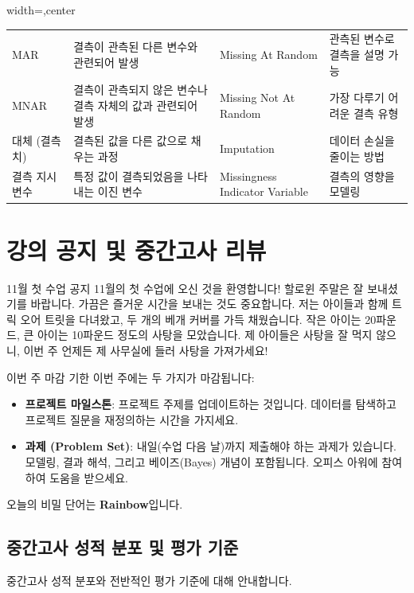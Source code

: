\documentclass[11pt,a4paper]{article}
\begin{document}
\begin{adjustbox}{width=\textwidth,center}
\begin{tabular}{llll}
MAR & 결측이 관측된 다른 변수와 관련되어 발생 & Missing At Random & 관측된 변수로 결측을 설명 가능 \\
MNAR & 결측이 관측되지 않은 변수나 결측 자체의 값과 관련되어 발생 & Missing Not At Random & 가장 다루기 어려운 결측 유형 \\
대체 (결측치) & 결측된 값을 다른 값으로 채우는 과정 & Imputation & 데이터 손실을 줄이는 방법 \\
결측 지시 변수 & 특정 값이 결측되었음을 나타내는 이진 변수 & Missingness Indicator Variable & 결측의 영향을 모델링 \\
\bottomrule
\end{tabular}
\end{adjustbox}

\newpage
\section*{강의 공지 및 중간고사 리뷰}

\begin{mybox}{11월 첫 수업 공지}
11월의 첫 수업에 오신 것을 환영합니다! 할로윈 주말은 잘 보내셨기를 바랍니다.
가끔은 즐거운 시간을 보내는 것도 중요합니다. 저는 아이들과 함께 트릭 오어 트릿을 다녀왔고, 두 개의 베개 커버를 가득 채웠습니다.
작은 아이는 20파운드, 큰 아이는 10파운드 정도의 사탕을 모았습니다.
제 아이들은 사탕을 잘 먹지 않으니, 이번 주 언제든 제 사무실에 들러 사탕을 가져가세요!
\end{mybox}

\begin{mybox}{이번 주 마감 기한}
이번 주에는 두 가지가 마감됩니다:
\begin{itemize}
    \item \textbf{프로젝트 마일스톤}: 프로젝트 주제를 업데이트하는 것입니다. 데이터를 탐색하고 프로젝트 질문을 재정의하는 시간을 가지세요.
    \item \textbf{과제 (Problem Set)}: 내일(수업 다음 날)까지 제출해야 하는 과제가 있습니다. 모델링, 결과 해석, 그리고 베이즈(Bayes) 개념이 포함됩니다. 오피스 아워에 참여하여 도움을 받으세요.
\end{itemize}
\end{mybox}

\begin{tcolorbox}[mybox={강의 중 언급: 오늘의 비밀 단어}]
오늘의 비밀 단어는 \textbf{Rainbow}입니다.
\end{tcolorbox}

\subsection*{중간고사 성적 분포 및 평가 기준}
중간고사 성적 분포와 전반적인 평가 기준에 대해 안내합니다.
\end{document}
